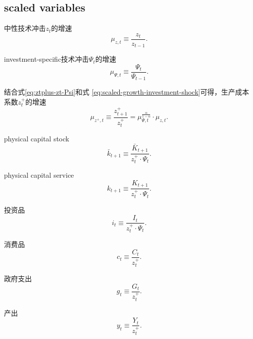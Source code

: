 \begin{subappendices}
\section{scaled variables}
\label{sec:scaled-variables}
中性技术冲击$z_t$的增速
\begin{equation}
  \label{eq:scaled-growth-neutral-shock}
  \mu_{z,t} \equiv \frac{z_t}{z_{t-1}}.
\end{equation}

investment-specific技术冲击$\Psi_t$的增速
\begin{equation}
  \label{eq:scaled-growth-investment-shock}
  \mu_{\Psi,t} \equiv \frac{\Psi_t}{\Psi_{t-1}}.
\end{equation}

结合式\eqref{eq:ztplus-zt-Psi}和式  \eqref{eq:scaled-growth-investment-shock}可得，生产成本系数$z_t^+$的增速
\begin{equation}
  \label{eq:scaled-growth-fixed-cost-shock}
  \mu_{z^+,t} \equiv \frac{z^+_{t+1}}{z^+_{t}} = \mu_{\Psi,t}^{\frac{\alpha}{1-\alpha}} \cdot \mu_{z,t}.
\end{equation}

physical capital stock
\begin{equation}
  \label{eq:scaled-physical-capital}
  \bar{k}_{t+1} \equiv \frac{\bar{K}_{t+1}}{z_t^{+} \cdot \Psi_{t}}.
\end{equation}

physical capital service
\begin{equation}
  \label{eq:scaled-physical-capital-service}
  k_{t+1} \equiv \frac{K_{t+1}}{z_{t}^+ \cdot \Psi_{t}}.
\end{equation}

投资品
\begin{equation}
  \label{eq:scaled-investment-goods}
  i_t \equiv \frac{I_t}{z_t^+ \cdot \Psi_{t}}.
\end{equation}

消费品
\begin{equation}
  \label{eq:scaled-consumption-goods}
  c_t \equiv \frac{C_t}{z_t^+}.
\end{equation}

政府支出
\begin{equation}
  \label{eq:scaled-government-consumption}
  g_t \equiv \frac{G_t}{z_t^+}.
\end{equation}

产出
\begin{equation}
  \label{eq:scaled-product}
  y_t \equiv \frac{Y_t}{z_t^+}.
\end{equation}


\end{subappendices}
